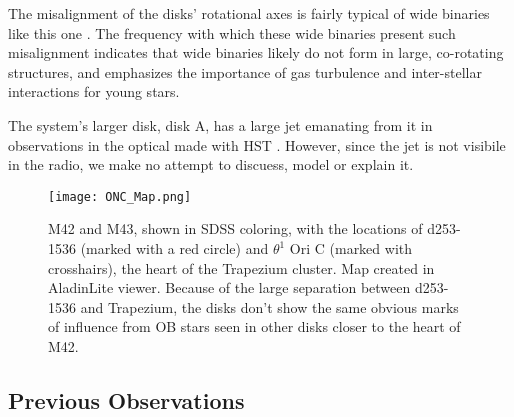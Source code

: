 The misalignment of the disks' rotational axes is fairly typical of wide binaries like this one \citep{Williams2014}. The frequency with which these wide binaries present such misalignment indicates that wide binaries likely do not form in large, co-rotating structures, and emphasizes the importance of gas turbulence and inter-stellar interactions for young stars.


The system's larger disk, disk A, has a large jet emanating from it in observations in the optical made with HST \citep{Smith2005}. However, since the jet is not visibile in the radio, we make no attempt to discuess, model or explain it.


\begin{figure}[t]
\centering
  \texttt{[image: ONC\_Map.png]}
  \caption{M42 and M43, shown in SDSS coloring, with the locations of d253-1536 (marked with a red circle) and $\theta^1$ Ori C (marked with crosshairs), the heart of the Trapezium cluster. Map created in AladinLite viewer. Because of the large separation between d253-1536 and Trapezium, the disks don't show the same obvious marks of influence from OB stars seen in other disks closer to the heart of M42.}
  \label{fig:onc_map}
\end{figure}
%




\subsection{Previous Observations}

\begin{figure}[htp]
  \hspace*{\fill}%
  \hfill%
  \hfill%
  \hfill%
  \hspace*{\fill}%
\end{figure}

